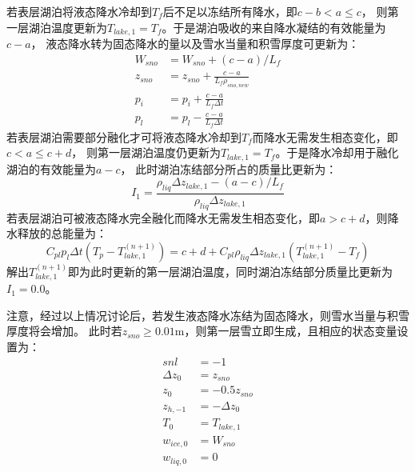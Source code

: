 若表层湖泊将液态降水冷却到$T_f$后不足以冻结所有降水，即$c-b<a\le c$，
则第一层湖泊温度更新为$T_{lake,1}=T_f$。于是湖泊吸收的来自降水凝结的有效能量为$c-a$，
液态降水转为固态降水的量以及雪水当量和积雪厚度可更新为：
\begin{equation}
\begin{aligned}
W_{sno} &= W_{sno} + (c-a) / L_f \\ 
z_{sno} &= z_{sno} + \frac{c-a}{L_f \rho_{sno,new}} \\ 
p_i &= p_i + \frac{c-a}{L_f \Delta t} \\ 
p_l &= p_l - \frac{c-a}{L_f \Delta t}
\end{aligned}
\end{equation}
若表层湖泊需要部分融化才可将液态降水冷却到$T_f$而降水无需发生相态变化，即$c<a\le c+d$，
则第一层湖泊温度仍更新为$T_{lake,1}=T_f$。于是降水冷却用于融化湖泊的有效能量为$a-c$，
此时湖泊冻结部分所占的质量比更新为：
\begin{equation}
I_{1}=\frac{\rho_{liq} \Delta z_{lake, 1}-(a-c) / L_{f}}{\rho_{liq} \Delta z_{lake, 1}}
\end{equation}
若表层湖泊可被液态降水完全融化而降水无需发生相态变化，即$a>c+d$，则降水释放的总能量为：
\begin{equation}
C_{pl} p_{l} \Delta t\left(T_{p}-T_{lake, 1}^{(n+1)}\right)=c+d+C_{pl} \rho_{liq} \Delta z_{lake, 1}\left(T_{lake, 1}^{(n+1)}-T_{f}\right)
\end{equation}
解出$T_{lake,1}^{\left(n+1\right)}$即为此时更新的第一层湖泊温度，同时湖泊冻结部分质量比更新为$I_1=0.0$。


注意，经过以上情况讨论后，若发生液态降水冻结为固态降水，则雪水当量与积雪厚度将会增加。
此时若$z_{sno}\geq0.01$m，则第一层雪立即生成，且相应的状态变量设置为：
\begin{equation}
\begin{aligned}
    snl &= -1 \\ 
    \Delta z_{0} &= z_{sno} \\ 
    z_{0} &= -0.5 z_{sno} \\
    z_{h,-1} &= -\Delta z_{0} \\ 
    T_{0} &= T_{lake, 1} \\
    w_{ice, 0} &= W_{sno} \\
    w_{liq, 0} &= 0
\end{aligned}
\end{equation}

